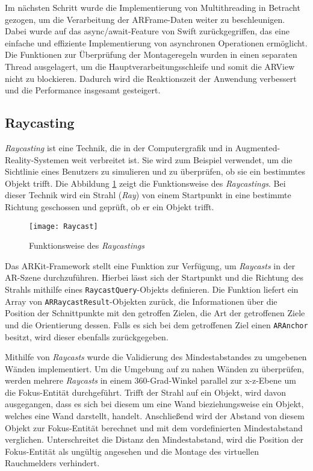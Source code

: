 Im nächsten Schritt wurde die Implementierung von Multithreading in Betracht gezogen, um die Verarbeitung der ARFrame-Daten weiter zu beschleunigen. Dabei wurde auf das async/await-Feature von Swift zurückgegriffen, das eine einfache und effiziente Implementierung von asynchronen Operationen ermöglicht. Die Funktionen zur Überprüfung der Montageregeln wurden in einen separaten Thread ausgelagert, um die Hauptverarbeitungsschleife und somit die ARView nicht zu blockieren. Dadurch wird die Reaktionszeit der Anwendung verbessert und die Performance insgesamt gesteigert.

\subsection{Raycasting} \label{Raycasting}
 

\textit{Raycasting} ist eine Technik, die in der Computergrafik und in Augmented-Reality-Systemen weit verbreitet ist. Sie wird zum Beispiel verwendet, um die Sichtlinie eines Benutzers zu simulieren und zu überprüfen, ob sie ein bestimmtes Objekt trifft. Die Abbildung \ref{fig:Raycasting} zeigt die Funktionsweise des \textit{Raycastings}. Bei dieser Technik wird ein Strahl (\textit{Ray}) von einem Startpunkt in eine bestimmte Richtung geschossen und geprüft, ob er ein Objekt trifft.

\begin{figure}[ht]
    \centering
    \texttt{[image: Raycast]}
    \caption{Funktionsweise des \textit{Raycastings}}
    \label{fig:Raycasting}
\end{figure}

Das ARKit-Framework stellt eine Funktion zur Verfügung, um \textit{Raycasts} in der AR-Szene durchzuführen. Hierbei lässt sich der Startpunkt und die Richtung des Strahls mithilfe eines \texttt{RaycastQuery}-Objekts definieren. Die Funktion liefert ein Array von \texttt{ARRaycastResult}-Objekten zurück, die Informationen über die Position der Schnittpunkte mit den getroffen Zielen, die Art der getroffenen Ziele und die Orientierung dessen. Falls es sich bei dem getroffenen Ziel einen \texttt{ARAnchor} besitzt, wird dieser ebenfalls zurückgegeben.

Mithilfe von \textit{Raycasts} wurde die Validierung des Mindestabstandes zu umgebenen Wänden implementiert. Um die Umgebung auf zu nahen Wänden zu überprüfen, werden mehrere \textit{Raycasts} in einem 360-Grad-Winkel parallel zur x-z-Ebene um die Fokus-Entität durchgeführt. Trifft der Strahl auf ein Objekt, wird davon ausgegangen, dass es sich bei diesem um eine Wand bieziehungsweise ein Objekt, welches eine Wand darstellt, handelt. Anschließend wird der Abstand von diesem Objekt zur Fokus-Entität berechnet und mit dem vordefinierten Mindestabstand verglichen. Unterschreitet die Distanz den Mindestabstand, wird die Position der Fokus-Entität als ungültig angesehen und die Montage des virtuellen Rauchmelders verhindert.

